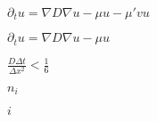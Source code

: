 \documentclass{article}
\begin{document}
$ \partial_t u = \nabla D \nabla u - \mu u - \mu' v u $
\pagebreak

$ \partial_t u = \nabla D \nabla u - \mu u $
\pagebreak

$ \frac{D \Delta t}{\Delta x^2} < \frac{1}{6} $
\pagebreak

$n_i$
\pagebreak

$i$
\pagebreak
\end{document}
